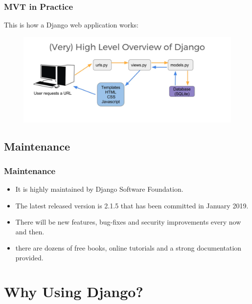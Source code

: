 \documentclass{beamer}
\begin{document}
\begin{frame}
\frametitle{MVT in Practice}
This is how a Django web application works:
\begin{figure}
	\includegraphics[width=\linewidth]{Pics/High_level.png}
\end{figure}
\end{frame}

\subsection{Maintenance}
\begin{frame}
	\frametitle{Maintenance}
	\begin{itemize}
		\item It is highly maintained by Django Software Foundation.
		\item The latest released version is 2.1.5 that has been committed in January 2019.
		\item There will be new features, bug-fixes and security improvements every now and then.
		\item there are dozens of free books, online tutorials and a strong documentation provided.
	\end{itemize}
\end{frame}

\section{Why Using Django?}
\end{document}
